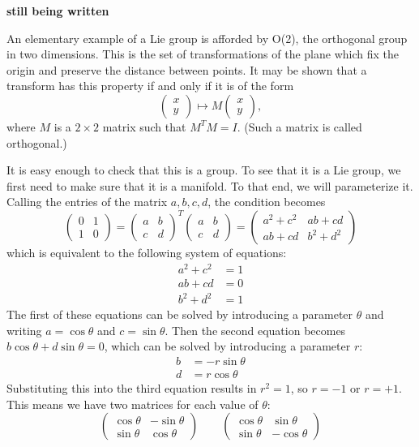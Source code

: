 \documentclass[12pt]{article}
\begin{document}
\textbf{still being written}

An elementary example of a Lie group is afforded by O(2),
the orthogonal group in two dimensions.  This is the set
of transformations of the plane which fix the origin and 
preserve the distance between points.  It may be shown 
that a transform has this property if and only if it is of
the form
\[
 \begin{pmatrix} x \\ y \end{pmatrix} \mapsto 
 M \begin{pmatrix} x \\ y \end{pmatrix} ,
\]
where $M$ is a $2 \times 2$ matrix such that $M^T M = I$.
(Such a matrix is called orthogonal.)

It is easy enough to check that this is a group.  To see
that it is a Lie group, we first need to make sure that it
is a manifold.  To that end, we will parameterize it.
Calling the entries of the matrix $a,b,c,d$, the condition
 becomes
\[
 \begin{pmatrix} 0 & 1 \\ 1 & 0 \end{pmatrix} =
 \begin{pmatrix} a & b \\ c & d \end{pmatrix}^T
 \begin{pmatrix} a & b \\ c & d \end{pmatrix} =
 \begin{pmatrix} a^2 + c^2 & ab + cd \\
       ab + cd & b^2 + d^2 \end{pmatrix}
\]
which is equivalent to the following system of equations:
\begin{align*}
 a^2 + c^2 &= 1 \\
 ab + cd &= 0 \\
 b^2 + d^2 &= 1
\end{align*}
The first of these equations can be solved by introducing a
parameter $\theta$ and writing $a = \cos \theta$ and $c =
\sin \theta$.  Then the second equation becomes $b \cos
\theta + d \sin \theta = 0$, which can be solved by 
introducing a parameter $r$:
\begin{align*}
 b &= - r \sin \theta \\
 d &= r \cos \theta
\end{align*}
Substituting this into the third equation results in $r^2 = 1$,
so $r = -1$ or $r = +1$.  This means we have two matrices for
each value of $\theta$:
\[
 \begin{pmatrix} \cos \theta & - \sin \theta \\
                 \sin \theta &   \cos \theta
 \end{pmatrix} \qquad
 \begin{pmatrix} \cos \theta &   \sin \theta \\
                 \sin \theta & - \cos \theta
 \end{pmatrix}
\]
\end{document}
